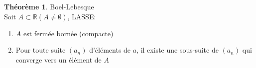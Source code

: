 \documentclass[fleqn]{article}
\theoremstyle{definition} \newtheorem*{defi}{D\'efinition}
\theoremstyle{definition} \newtheorem*{theo}{Th\'eor\`eme}
\theoremstyle{definition} \newtheorem*{adh}{Caract\'erisation s\'equentielle de l'adh\'erence}
\theoremstyle{definition} \newtheorem*{prop}{Propri\'et\'e}
\theoremstyle{definition} \newtheorem*{fermitude}{Caract\'erisation s\'equentielle de la fermitude}
\begin{document}
\begin{theo}
	Boel-Lebesque \\ Soit $A \subset \mathbb{R} (A \neq \emptyset)$, LASSE:
	\begin{enumerate}
		\item $A$ est ferm\'ee born\'ee (compacte)
		\item Pour toute suite $(a_n)$ d'\'el\'ements de $a$, il existe une sous-suite de $(a_n)$ qui converge vers un \'el\'ement de $A$
	\end{enumerate}
\end{theo}
\end{document}
